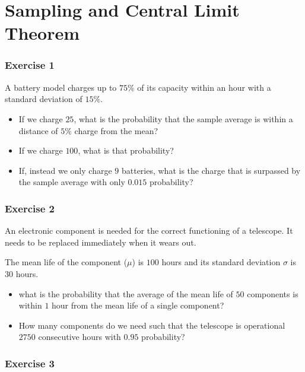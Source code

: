 \documentclass[
]{book}
\begin{document}
\hypertarget{sampling-and-central-limit-theorem}{%
\section{Sampling and Central Limit Theorem}\label{sampling-and-central-limit-theorem}}

\hypertarget{exercise-1-6}{%
\subsubsection{Exercise 1}\label{exercise-1-6}}

A battery model charges up to \(75\%\) of its capacity within an hour with a standard deviation of \(15\%\).

\begin{itemize}
\item
  If we charge \(25\), what is the probability that the sample average is within a distance of \(5\%\) charge from the mean?
\item
  If we charge \(100\), what is that probability?
\item
  If, instead we only charge \(9\) batteries, what is the charge that is surpassed by the sample average with only \(0.015\) probability?
\end{itemize}

\hypertarget{exercise-2-6}{%
\subsubsection{Exercise 2}\label{exercise-2-6}}

An electronic component is needed for the correct functioning of a telescope. It needs to be replaced immediately when it wears out.

The mean life of the component (\(\mu\)) is \(100\) hours and its standard deviation \(\sigma\) is \(30\) hours.

\begin{itemize}
\item
  what is the probability that the average of the mean life of \(50\) components is within \(1\) hour from the mean life of a single component?
\item
  How many components do we need such that the telescope is operational \(2750\) consecutive hours with \(0.95\) probability?
\end{itemize}

\hypertarget{exercise-3-3}{%
\subsubsection{Exercise 3}\label{exercise-3-3}}
\end{document}
